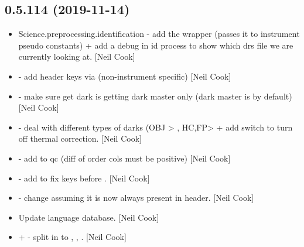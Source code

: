 \documentclass[a4paper,10pt,english]{report}
\begin{document}
\subsection{0.5.114 (2019-11-14)}
\label{\detokenize{misc/changelog:id28}}\begin{itemize}
\item {} 
Science.preprocessing.identification - add the  wrapper
(passes it to instrument pseudo constants) + add a debug in id process
to show which drs file we are currently looking at. {[}Neil Cook{]}

\item {} 
 - add header keys via 
(non-instrument specific) {[}Neil Cook{]}

\item {} 
 - make sure get dark is getting dark master only
(dark master is  by default) {[}Neil Cook{]}

\item {} 
 - deal with different types of darks (OBJ \textendash{}\textgreater{}
, HC,FP\textendash{}\textgreater{}  + add switch to turn off thermal
correction. {[}Neil Cook{]}

\item {} 
 - add  to qc (diff of order
cols must be positive) {[}Neil Cook{]}

\item {} 
 - add  to fix keys before
. {[}Neil Cook{]}

\item {} 
 - change  assuming it is now always
present in header. {[}Neil Cook{]}

\item {} 
Update language database. {[}Neil Cook{]}

\item {} 
 +  - split
 in to , , . {[}Neil
Cook{]}


\end{itemize}
\end{document}
